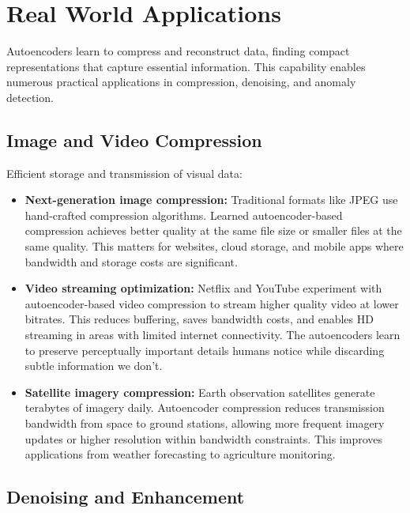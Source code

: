
\section{Real World Applications}
\label{sec:autoencoder-real-world}


Autoencoders learn to compress and reconstruct data, finding compact representations that capture essential information. This capability enables numerous practical applications in compression, denoising, and anomaly detection.

\subsection{Image and Video Compression}

Efficient storage and transmission of visual data:

\begin{itemize}
    \item \textbf{Next-generation image compression:} Traditional formats like JPEG use hand-crafted compression algorithms. Learned autoencoder-based compression achieves better quality at the same file size or smaller files at the same quality. This matters for websites, cloud storage, and mobile apps where bandwidth and storage costs are significant.
    
    \item \textbf{Video streaming optimization:} Netflix and YouTube experiment with autoencoder-based video compression to stream higher quality video at lower bitrates. This reduces buffering, saves bandwidth costs, and enables HD streaming in areas with limited internet connectivity. The autoencoders learn to preserve perceptually important details humans notice while discarding subtle information we don't.
    
    \item \textbf{Satellite imagery compression:} Earth observation satellites generate terabytes of imagery daily. Autoencoder compression reduces transmission bandwidth from space to ground stations, allowing more frequent imagery updates or higher resolution within bandwidth constraints. This improves applications from weather forecasting to agriculture monitoring.
\end{itemize}

\subsection{Denoising and Enhancement}

